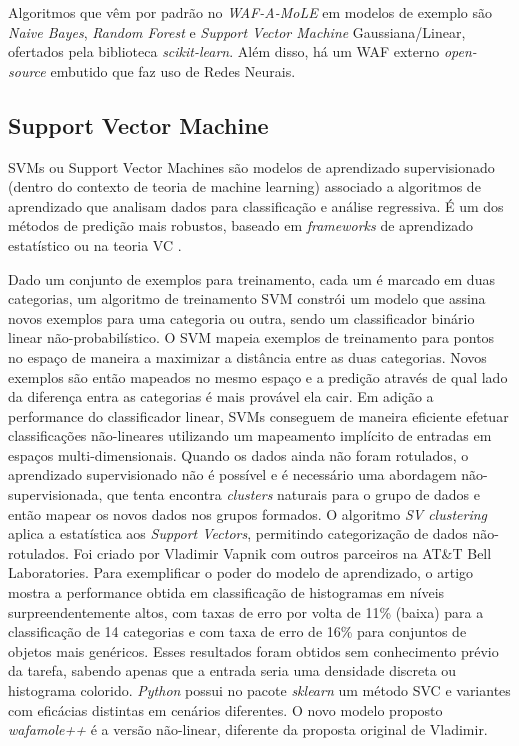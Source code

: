 Algoritmos que vêm por padrão no \textit{WAF-A-MoLE} em modelos de exemplo são \textit{Naive Bayes}, \textit{Random Forest} e \textit{Support Vector Machine} Gaussiana/Linear, ofertados pela biblioteca \textit{scikit-learn}. Além disso, há um WAF externo \textit{open-source} embutido que faz uso de Redes Neurais.

\subsection{Support Vector Machine}
SVMs ou Support Vector Machines são modelos de aprendizado supervisionado (dentro do contexto de teoria de machine learning) associado a algoritmos de aprendizado que analisam dados para classificação e análise regressiva. É um dos métodos de predição mais robustos, baseado em \textit{frameworks} de aprendizado estatístico ou na teoria VC \cite{ben2001_vapnik_support}.

Dado um conjunto de exemplos para treinamento, cada um é marcado em duas categorias, um algoritmo de treinamento SVM constrói um modelo que assina novos exemplos para uma categoria ou outra, sendo um classificador binário linear não-probabilístico. 
O SVM mapeia exemplos de treinamento para pontos no espaço de maneira a maximizar a distância entre as duas categorias. Novos exemplos são então mapeados no mesmo espaço e a predição através de qual lado da diferença entra as categorias é mais provável ela cair. Em adição a performance do classificador linear, SVMs conseguem de maneira eficiente efetuar classificações não-lineares utilizando um mapeamento implícito de entradas em espaços multi-dimensionais.
Quando os dados ainda não foram rotulados, o aprendizado supervisionado não é possível e é necessário uma abordagem não-supervisionada, que tenta encontra \textit{clusters} naturais para o grupo de dados e então mapear os novos dados nos grupos formados. O algoritmo \textit{SV clustering} aplica a estatística aos \textit{Support Vectors}, permitindo categorização de dados não-rotulados.
Foi criado por Vladimir Vapnik com outros parceiros na AT\&T Bell Laboratories.
Para exemplificar o poder do modelo de aprendizado, o artigo \cite{vapnik_svm_support} mostra a performance obtida em classificação de histogramas em níveis surpreendentemente altos, com taxas de erro por volta de 11\% (baixa) para a classificação de 14 categorias e com taxa de erro de 16\% para conjuntos de objetos mais genéricos. Esses resultados foram obtidos sem conhecimento prévio da tarefa, sabendo apenas que a entrada seria uma densidade discreta ou histograma colorido.
\textit{Python} possui no pacote \textit{sklearn} um método SVC e variantes com eficácias distintas em cenários diferentes.
O novo modelo proposto \textit{wafamole++} é a versão não-linear, diferente da proposta original de Vladimir.


